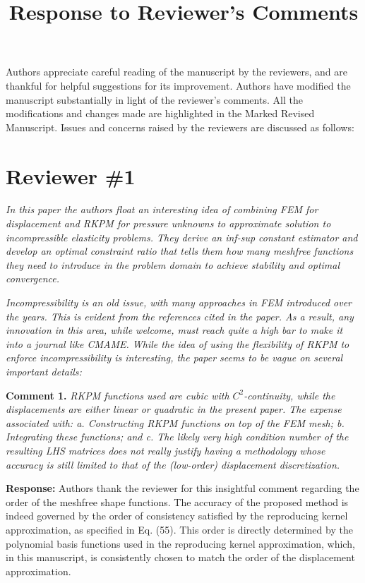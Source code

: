 \documentclass{article}
\title{Response to Reviewer's Comments}
\author{}
\date{}
\begin{document}
\maketitle

Authors appreciate careful reading of the manuscript by the reviewers, and are thankful for helpful suggestions for its improvement. Authors have modified the manuscript substantially in light of the reviewer's comments. All the modifications and changes made are highlighted in the Marked Revised Manuscript. Issues and concerns raised by the reviewers are discussed as follows:

\section*{Reviewer \#1}
\textit{In this paper the authors float an interesting idea of combining FEM for displacement and RKPM for pressure unknowns to approximate solution to incompressible elasticity problems. They derive an inf-sup constant estimator and develop an optimal constraint ratio that tells them how many meshfree functions they need to introduce in the problem domain to achieve stability and optimal convergence.}

\textit{Incompressibility is an old issue, with many approaches in FEM introduced over the years. This is evident from the references cited in the paper. As a result, any innovation in this area, while welcome, must reach quite a high bar to make it into a journal like CMAME. While the idea of using the flexibility of RKPM to enforce incompressibility is interesting, the paper seems to be vague on several important details:}

\textbf{Comment 1.} \textit{RKPM functions used are cubic with $C^2$-continuity, while the displacements are either linear or quadratic in the present paper. The expense associated with: a. Constructing RKPM functions on top of the FEM mesh; b. Integrating these functions; and c. The likely very high condition number of the resulting LHS matrices does not really justify having a methodology whose accuracy is still limited to that of the (low-order) displacement discretization.}

\textbf{Response:} 
Authors thank the reviewer for this insightful comment regarding the order of the meshfree shape functions.
The accuracy of the proposed method is indeed governed by the order of consistency satisfied by the reproducing kernel approximation, as specified in Eq. (55).
This order is directly determined by the polynomial basis functions used in the reproducing kernel approximation, which, in this manuscript, is consistently chosen to match the order of the displacement approximation.
\end{document}
